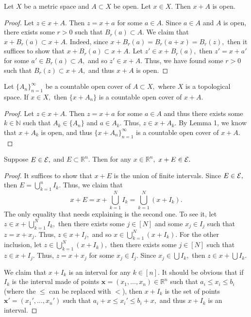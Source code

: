 \documentclass[11pt]{article}
\newcommand{\bbN}{\mathbb{N}}
\newcommand{\bbR}{\mathbb{R}}
\begin{document}
\begin{solution}
    \begin{lemma}
    Let $X$ be a metric space and $A \subset X$ be open. Let $x\in X.$ Then $x + A$ is open.
    \end{lemma}
    \begin{proof}
        Let $z \in x + A.$ Then $z = x + a$ for some $a \in A.$ Since $a \in A$ and $A$ is open, there exists some $r>0$ such that $B_r(a)\subset A.$ We claim that $x + B_r(a) \subset x + A.$ Indeed, since $x + B_r(a) = B_r(a + x) = B_r(z),$ then it suffices to show that $x + B_r(a) \subset x + A.$ Let $z' \in x + B_r(a),$ then $z' = x + a'$ for some $a' \in B_r(a) \subset A,$ and so $z' \in x + A.$ Thus, we have found some $r>0$ such that $B_r(z)\subset x + A,$ and thus $x + A$ is open.
    \end{proof}
    \begin{lemma}
        Let $\{A_n\}_{n =1}^\infty$ be a countable open cover of $A \subset X,$ where $X$ is a topological space. If $x \in X,$ then $\{x + A_n\}$ is a countable open cover of $x + A.$
    \end{lemma}
    \begin{proof}
        Let $z \in x + A.$ Then $z = x + a$ for some $a\in A$ and thus there exists some $k \in \bbN$ such that $A_k \in \{A_n\}$ and $a \in A_k.$ Thus, $z\in x + A_k.$ By Lemma 1, we know that $x + A_k$ is open, and thus $\{x + A_n\}_{n =1}^\infty$ is a countable open cover of $x + A.$
    \end{proof}
    \begin{lemma}
     Suppose $E \in \cal E,$ and $E \subset \bbR^n.$ Then for any $x\in \bbR^n,$ $x + E \in \cal E.$
    \end{lemma}
    \begin{proof}
        It suffices to show that $x + E$ is the union of finite intervals. Since $E \in \cal E,$ then $E = \bigcup_{k=1}^n I_k.$ Thus, we claim that
        \[x + E = x + \bigcup_{k=1}^N I_k = \bigcup_{k=1}^N(x + I_k).\] The only equality that needs explaining is the second one. To see it, let $z \in x + \bigcup_{k=1}^N I_k,$ then there exists some $j \in [N]$ and some $x_j \in I_j$ such that $z = x + x_j.$ Thus, $z \in x + I_j,$ and so $x \in \bigcup_{k=1}^N (x + I_k).$ For the other inclusion, let $z\in \bigcup_{k=1}^N (x + I_k),$ then there exists some $j \in [N]$ such that $z\in x + I_j.$ Thus, $z = x + x_j$ for some $x_j \in I_j.$ Since $x_j \in \bigcup I_k,$ then $z \in x + \bigcup I_k.$
        
        We claim that $x + I_k$ is an interval for any $k \in [n].$ It should be obvious that if $I_k$ is the interval made of points $\textbf{x} = (x_1, \dots, x_n) \in \bbR^n$ such that $a_i \leq x_i \leq b_i$ (where the $\leq$ can be replaced with $<$), then $x + I_k$ is the set of points $\textbf{x}' = (x_1', \dots, x_n')$ such that $a_i  + x \leq x_i' \leq b_i + x,$ and thus $x + I_k$ is an interval. 
    \end{proof}
    

\end{solution}
\end{document}

